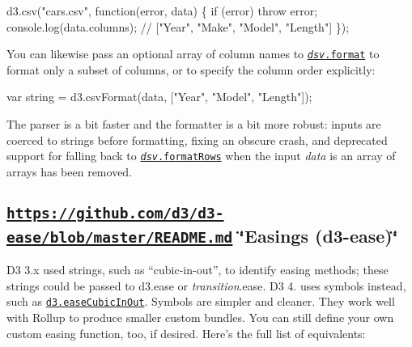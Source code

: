 \begin{DoxyCode}
d3.csv("cars.csv", function(error, data) \{
  if (error) throw error;
  console.log(data.columns); // ["Year", "Make", "Model", "Length"]
\});
\end{DoxyCode}


You can likewise pass an optional array of column names to \href{https://github.com/d3/d3-dsv/blob/master/README.md#dsv_format}{\tt {\itshape dsv}.format} to format only a subset of columns, or to specify the column order explicitly\+:


\begin{DoxyCode}
var string = d3.csvFormat(data, ["Year", "Model", "Length"]);
\end{DoxyCode}


The parser is a bit faster and the formatter is a bit more robust\+: inputs are coerced to strings before formatting, fixing an obscure crash, and deprecated support for falling back to \href{https://github.com/d3/d3-dsv/blob/master/README.md#dsv_formatRows}{\tt {\itshape dsv}.format\+Rows} when the input {\itshape data} is an array of arrays has been removed.

\subsection*{\href{https://github.com/d3/d3-ease/blob/master/README.md}{\tt https\+://github.\+com/d3/d3-\/ease/blob/master/\+R\+E\+A\+D\+M\+E.\+md} \char`\"{}\+Easings (d3-\/ease)\char`\"{}}

D3 3.\+x used strings, such as “cubic-\/in-\/out”, to identify easing methods; these strings could be passed to d3.\+ease or {\itshape transition}.ease. D3 4. uses symbols instead, such as \href{https://github.com/d3/d3-ease/blob/master/README.md#easeCubicInOut}{\tt d3.\+ease\+Cubic\+In\+Out}. Symbols are simpler and cleaner. They work well with Rollup to produce smaller custom bundles. You can still define your own custom easing function, too, if desired. Here’s the full list of equivalents\+:


